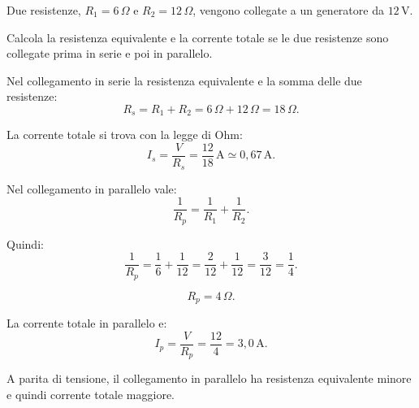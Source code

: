 
\begin{esercizio}
Due resistenze, \(R_1=6\,\Omega\) e \(R_2=12\,\Omega\), vengono collegate
a un generatore da \(12\,\mathrm{V}\).

Calcola la resistenza equivalente e la corrente totale se le due resistenze
sono collegate prima in serie e poi in parallelo.
\end{esercizio}

\begin{soluzione}
Nel collegamento in serie la resistenza equivalente e la somma delle due
resistenze:
\[
R_s=R_1+R_2=6\,\Omega+12\,\Omega=18\,\Omega.
\]

La corrente totale si trova con la legge di Ohm:
\[
I_s=\frac{V}{R_s}=\frac{12}{18}\,\mathrm{A}\simeq 0{,}67\,\mathrm{A}.
\]

Nel collegamento in parallelo vale:
\[
\frac{1}{R_p}=\frac{1}{R_1}+\frac{1}{R_2}.
\]

Quindi:
\[
\frac{1}{R_p}=\frac{1}{6}+\frac{1}{12}
=\frac{2}{12}+\frac{1}{12}
=\frac{3}{12}
=\frac{1}{4}.
\]

\[
R_p=4\,\Omega.
\]

La corrente totale in parallelo e:
\[
I_p=\frac{V}{R_p}=\frac{12}{4}=3{,}0\,\mathrm{A}.
\]

A parita di tensione, il collegamento in parallelo ha resistenza equivalente
minore e quindi corrente totale maggiore.
\end{soluzione}
